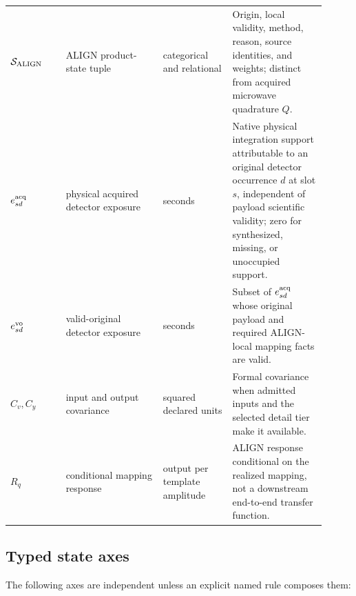 \begin{longtable}{L{0.16\linewidth}L{0.28\linewidth}L{0.20\linewidth}L{0.27\linewidth}}
\(\mathcal S_{\rm ALIGN}\) & ALIGN product-state tuple & categorical and relational & Origin, local validity, method, reason, source identities, and weights; distinct from acquired microwave quadrature \(Q\).\\
\(e^{\rm acq}_{sd}\) & physical acquired detector exposure & seconds & Native physical integration support attributable to an original detector occurrence \(d\) at slot \(s\), independent of payload scientific validity; zero for synthesized, missing, or unoccupied support.\\
\(e^{\rm vo}_{sd}\) & valid-original detector exposure & seconds & Subset of \(e^{\rm acq}_{sd}\) whose original payload and required ALIGN-local mapping facts are valid.\\
\(C_v,C_y\) & input and output covariance & squared declared units & Formal covariance when admitted inputs and the selected detail tier make it available.\\
\(R_q\) & conditional mapping response & output per template amplitude & ALIGN response conditional on the realized mapping, not a downstream end-to-end transfer function.\\
\bottomrule
\end{longtable}

\subsection{Typed state axes}

The following axes are independent unless an explicit named rule composes
them:

